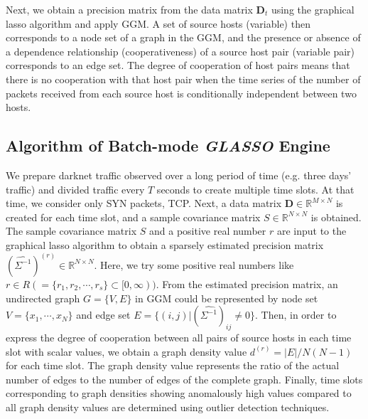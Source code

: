 \documentclass[conference]{IEEEtran}
\begin{document}
Next, we obtain a precision matrix from the data matrix $\bm{D}_t$ using the graphical lasso algorithm and apply GGM.
A set of source hosts (variable) then corresponds to a node set of a graph in the GGM, and the presence or absence of a dependence relationship (cooperativeness) of a source host pair (variable pair) corresponds to an edge set.
The degree of cooperation of host pairs means that there is no cooperation with that host pair when the time series of the number of packets received from each source host is conditionally independent between two hosts.




\subsection{Algorithm of Batch-mode {\it GLASSO} Engine}
We prepare darknet traffic observed over a long period of time (e.g. three days' traffic) and divided traffic every $T$ seconds to create multiple time slots.
At that time, we consider only SYN packets, TCP.
Next, a data matrix $\bm{D}\in\mathbb{R}^{M \times N}$ is created for each time slot, and a sample covariance matrix $S\in\mathbb{R}^{N \times N}$ is obtained.
The sample covariance matrix $S$ and a positive real number $r$ are input to the graphical lasso algorithm to obtain a sparsely estimated precision matrix ${(\hat{\Sigma^{-1}})}^{(r)}\in\mathbb{R}^{N \times N}$.
Here, we try some positive real numbers like $r \in R ( = \{r_1, r_2, \cdots, r_s\} \subset [0,\infty))$.
From the estimated precision matrix, an undirected graph $G = \{V, E\}$ in GGM could be represented by node set $V=\{x_{1}, \cdots, x_{N}\}$ and edge set $E=\{(i,j)|{(\hat{\Sigma^{-1}})}_{ij}\neq0\}$.
Then, in order to express the degree of cooperation between all pairs of source hosts in each time slot with scalar values, we obtain a graph density value $d^{(r)}=|E|/N(N-1)$ for each time slot.
The graph density value represents the ratio of the actual number of edges to the number of edges of the complete graph.
Finally, time slots corresponding to graph densities showing anomalously high values compared to all graph density values are determined using outlier detection techniques.
\end{document}
